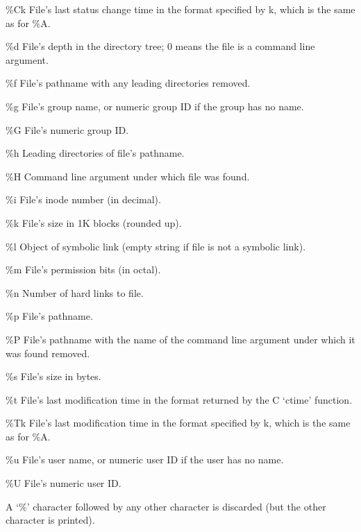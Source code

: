 \begin{description}
              \%Ck    File's last status change time in the format
                     specified by k, which is the same as for \%A.

              \%d     File's depth in the directory tree; 0  means
                     the file is a command line argument.

              \%f     File's pathname with any leading directories
                     removed.

              \%g     File's group name, or numeric  group  ID  if
                     the group has no name.

              \%G     File's numeric group ID.

              \%h     Leading directories of file's pathname.

              \%H     Command  line  argument under which file was
                     found.

              \%i     File's inode number (in decimal).

              \%k     File's size in 1K blocks (rounded up).

              \%l     Object of symbolic  link  (empty  string  if
                     file is not a symbolic link).

              \%m     File's permission bits (in octal).

              \%n     Number of hard links to file.

              \%p     File's pathname.

              \%P     File's pathname with the name of the command
                     line  argument  under  which  it  was  found
                     removed.

              \%s     File's size in bytes.

              \%t     File's  last modification time in the format
                     returned by the C `ctime' function.

              \%Tk    File's last modification time in the  format
                     specified by k, which is the same as for \%A.

              \%u     File's user name, or numeric user ID if  the
                     user has no name.

              \%U     File's numeric user ID.

              A  `\%' character followed by any other character is
              discarded (but the other character is printed).


\end{description}
